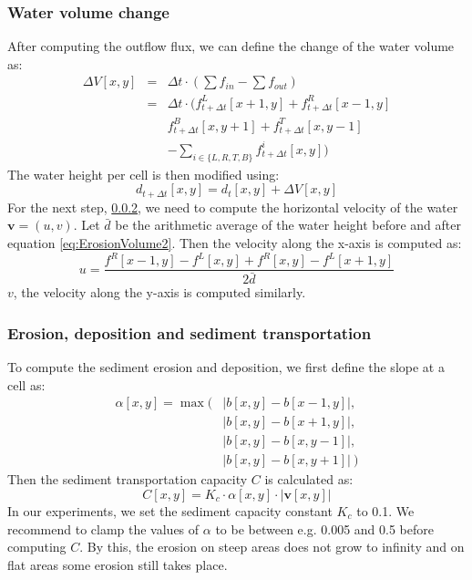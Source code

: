 \documentclass[journal, letterpaper]{IEEEtran}
\begin{document}
\subsubsection{Water volume change}\label{Erosion3}
After computing the outflow flux, we can define the change of the water volume as:
\begin{equation}
\begin{array}{rcl}
	\Delta V[x,y] &=& \Delta t \cdot (\sum{f_{in}} - \sum{f_{out}}) \\
	              &=& \Delta t \cdot (f_{t+\Delta t}^L[x+1,y] + f_{t+\Delta t}^R[x-1,y] \\
								& & f_{t+\Delta t}^B[x,y+1] + f_{t+\Delta t}^T[x,y-1] \\
								& & - \sum_{i\in\{L,R,T,B\}}{f_{t+\Delta t}^i[x,y]} )
\end{array}
\label{eq:ErosionVolume1}
\end{equation}
The water height per cell is then modified using:
\begin{equation}
	d_{t+\Delta t}[x,y] = d_t[x,y] + \Delta V[x,y]
\label{eq:ErosionVolume2}
\end{equation}
For the next step, \ref{ErosionDeposition}, we need to compute the horizontal velocity of the water $\textbf{v}=(u,v)$.
Let $\bar{d}$ be the arithmetic average of the water height before and after equation \ref{eq:ErosionVolume2}.
Then the velocity along the x-axis is computed as:
\begin{equation}
	u = \frac{f^R[x-1,y]-f^L[x,y] + f^R[x,y]-f^L[x+1,y]}{2\bar{d}}
\label{eq:ErosionVolume3}
\end{equation}
$v$, the velocity along the y-axis is computed similarly.

\subsubsection{Erosion, deposition and sediment transportation}\label{ErosionDeposition}
To compute the sediment erosion and deposition, we first define the slope at a cell as:
\begin{equation}
\begin{array}{rl}
	\alpha[x,y] = \max(&|b[x,y]-b[x-1,y]|,\\
	                   &|b[x,y]-b[x+1,y]|,\\
										 &|b[x,y]-b[x,y-1]|,\\
										 &|b[x,y]-b[x,y+1]|\ )
\end{array}
\label{eq:ErosionSediment1}
\end{equation}
Then the sediment transportation capacity $C$ is calculated as:
\begin{equation}
	C[x,y]=K_c \cdot \alpha[x,y] \cdot |\textbf{v}[x,y]|
\label{eq:ErosionSediment2}
\end{equation}
In our experiments, we set the sediment capacity constant $K_c$ to 0.1.
We recommend to clamp the values of $\alpha$ to be between e.g. 0.005 and 0.5 before computing $C$. By this, the erosion on steep areas does not grow to infinity and on flat areas some erosion still takes place.
\end{document}

